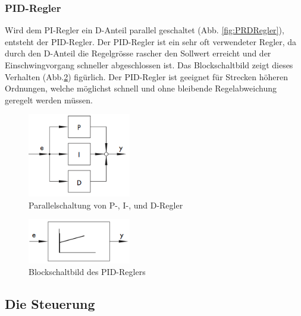 \subsubsection{PID-Regler}
Wird    dem    PI-Regler    ein    D-Anteil    parallel    geschaltet    (Abb.
\ref{fig:PRDRegler}),  entsteht der  PID-Regler. Der PID-Regler  ist ein  sehr
oft  verwendeter  Regler, da  durch  den  D-Anteil die  Regelgr\"osse  rascher
den  Sollwert  erreicht  und  der  Einschwingvorgang  schneller  abgeschlossen
ist. Das  Blockschaltbild  zeigt dieses  Verhalten  (Abb.\ref{fig:PIDRegler2})
fig\"urlich. Der PID-Regler  ist geeignet f\"ur Strecken  h\"oheren Ordnungen,
welche m\"oglichst schnell und  ohne bleibende Regelabweichung geregelt werden
m\"ussen.

\begin{figure}[h!, width=\pagewidth]
    \begin{center}
    \includegraphics[width=0.4\textwidth]{images/PRDRegler1}
    \caption{Parallelschaltung von P-, I-, und D-Regler}
    \label{fig:PRDRegler1}
    \end{center}
\end{figure}

\begin{figure}[h!, width=\pagewidth]
    \begin{center}
    \includegraphics[width=0.4\textwidth]{images/PIDRegler2}
    \caption{Blockschaltbild des PID-Reglers}
    \label{fig:PIDRegler2}
    \end{center}
\end{figure}


\subsection{Die Steuerung}


